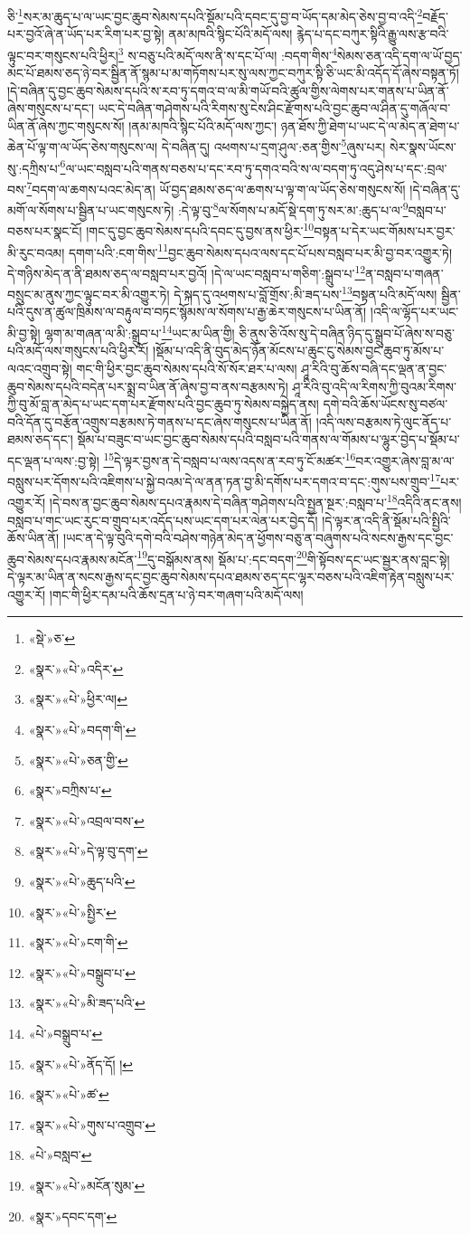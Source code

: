 ཅི་\footnote{«སྡེ་»ཅ་}སར་མ་ཆུད་པ་ལ་ཡང་བྱང་ཆུབ་སེམས་དཔའི་སྡོམ་པའི་དབང་དུ་བྱ་བ་ཡོད་དམ་མེད་ཅེས་བྱ་བ་འདི་\footnote{«སྣར་»«པེ་»འདིར་}བརྗོད་པར་བྱའོ་ཞེ་ན་ཡོད་པར་རིག་པར་བྱ་སྟེ། ནམ་མཁའི་སྙིང་པོའི་མདོ་ལས། རྙེད་པ་དང་བཀུར་སྟིའི་རྒྱུ་ལས་རྩ་བའི་ལྟུང་བར་གསུངས་པའི་ཕྱིར།\footnote{«སྣར་»«པེ་»ཕྱིར་ལ།} ས་བཅུ་པའི་མདོ་ལས་ནི་ས་དང་པོ་ལ། :བདག་གིས་\footnote{«སྣར་»«པེ་»བདག་གི་}སེམས་ཅན་འདི་དག་ལ་ཡོ་བྱད་མང་པོ་ཐམས་ཅད་ཉེ་བར་སྦྱིན་ནོ་སྙམ་པ་མ་གཏོགས་པར་སུ་ལས་ཀྱང་བཀུར་སྟི་ཅི་ཡང་མི་འདོད་དོ་ཞེས་བསྟན་ཏོ། །དེ་བཞིན་དུ་བྱང་ཆུབ་སེམས་དཔའི་ས་རབ་ཏུ་དགའ་བ་ལ་མི་གཡོ་བའི་ཚུལ་གྱིས་ལེགས་པར་གནས་པ་ཡིན་ནོ་ཞེས་གསུངས་པ་དང་། ཡང་དེ་བཞིན་གཤེགས་པའི་རིགས་སུ་ངེས་ཤིང་རྫོགས་པའི་བྱང་ཆུབ་ལ་ཤིན་དུ་གཞོལ་བ་ཡིན་ནོ་ཞེས་ཀྱང་གསུངས་སོ། །ནམ་མཁའི་སྙིང་པོའི་མདོ་ལས་ཀྱང་། ཉན་ཐོས་ཀྱི་ཐེག་པ་ཡང་དེ་ལ་མེད་ན་ཐེག་པ་ཆེན་པོ་ལྟ་ག་ལ་ཡོད་ཅེས་གསུངས་ལ། དེ་བཞིན་དུ། འཕགས་པ་དྲག་ཤུལ་:ཅན་གྱིས་\footnote{«སྣར་»«པེ་»ཅན་གྱི་}ཞུས་པར། སེར་སྣས་ཡོངས་སུ་:དཀྲིས་པ་\footnote{«སྣར་»བཀྲིས་པ་}ལ་ཡང་བསླབ་པའི་གནས་བཅས་པ་དང་རབ་ཏུ་དགའ་བའི་ས་ལ་བདག་ཏུ་འདུ་ཤེས་པ་དང་:བྲལ་བས་\footnote{«སྣར་»«པེ་»འབྲལ་བས་}བདག་ལ་ཆགས་པའང་མེད་ན། ཡོ་བྱད་ཐམས་ཅད་ལ་ཆགས་པ་ལྟ་ག་ལ་ཡོད་ཅེས་གསུངས་སོ། །དེ་བཞིན་དུ་མགོ་ལ་སོགས་པ་སྦྱིན་པ་ཡང་གསུངས་ཏེ། :དེ་ལྟ་བུ་\footnote{«སྣར་»«པེ་»དེ་ལྟ་བུ་དག་}ལ་སོགས་པ་མདོ་སྡེ་དག་ཏུ་སར་མ་:ཆུད་པ་ལ་\footnote{«སྣར་»«པེ་»ཆུད་པའི་}བསླབ་པ་བཅས་པར་སྣང་ངོ། །གང་དུ་བྱང་ཆུབ་སེམས་དཔའི་དབང་དུ་བྱས་ནས་ཕྱིར་\footnote{«སྣར་»«པེ་»སྤྱིར་}བསྟན་པ་དེར་ཡང་གོམས་པར་བྱར་མི་རུང་བའམ། དགག་པའི་:ངག་གིས་\footnote{«སྣར་»«པེ་»ངག་གི་}བྱང་ཆུབ་སེམས་དཔའ་ལས་དང་པོ་པས་བསླབ་པར་མི་བྱ་བར་འགྱུར་ཏེ། དེ་གཉིས་མེད་ན་ནི་ཐམས་ཅད་ལ་བསླབ་པར་བྱའོ། །དེ་ལ་ཡང་བསླབ་པ་གཅིག་:སྒྲུབ་པ་\footnote{«སྣར་»«པེ་»བསྒྲུབ་པ་}ན་བསླབ་པ་གཞན་བསྲུང་མ་ནུས་ཀྱང་ལྟུང་བར་མི་འགྱུར་ཏེ། དེ་སྐད་དུ་འཕགས་པ་བློ་གྲོས་:མི་ཟད་པས་\footnote{«སྣར་»«པེ་»མི་ཟད་པའི་}བསྟན་པའི་མདོ་ལས། སྦྱིན་པའི་དུས་ན་ཚུལ་ཁྲིམས་ལ་བརྟུལ་བ་བཏང་སྙོམས་ལ་སོགས་པ་རྒྱ་ཆེར་གསུངས་པ་ཡིན་ནོ། །འདི་ལ་ལྷོད་པར་ཡང་མི་བྱ་སྟེ། ལྷག་མ་གཞན་ལ་མི་:སྒྲུབ་པ་\footnote{«པེ་»བསྒྲུབ་པ་}ཡང་མ་ཡིན་གྱི། ཅི་ནུས་ཅི་འོས་སུ་དེ་བཞིན་ཉིད་དུ་སྒྲུབ་པོ་ཞེས་ས་བཅུ་པའི་མདོ་ལས་གསུངས་པའི་ཕྱིར་རོ། །སྡོམ་པ་འདི་ནི་བུད་མེད་ཉོན་མོངས་པ་ཆུང་ངུ་སེམས་བྱང་ཆུབ་ཏུ་མོས་པ་ལའང་འགྲུབ་སྟེ། གང་གི་ཕྱིར་བྱང་ཆུབ་སེམས་དཔའི་སོ་སོར་ཐར་པ་ལས། ཤཱ་རིའི་བུ་ཆོས་བཞི་དང་ལྡན་ན་བྱང་ཆུབ་སེམས་དཔའི་བདེན་པར་སྨྲ་བ་ཡིན་ནོ་ཞེས་བྱ་བ་ནས་བརྩམས་ཏེ། ཤཱ་རིའི་བུ་འདི་ལ་རིགས་ཀྱི་བུའམ་རིགས་ཀྱི་བུ་མོ་བླ་ན་མེད་པ་ཡང་དག་པར་རྫོགས་པའི་བྱང་ཆུབ་ཏུ་སེམས་བསྐྱེད་ནས། དགེ་བའི་ཆོས་ཡོངས་སུ་བཙལ་བའི་དོན་དུ་བརྩོན་འགྲུས་བརྩམས་ཏེ་གནས་པ་དང་ཞེས་གསུངས་པ་ཡིན་ནོ། །འདི་ལས་བརྩམས་ཏེ་ལུང་ནོད་པ་ཐམས་ཅད་དང་། སྡོམ་པ་བཟུང་བ་ཡང་བྱང་ཆུབ་སེམས་དཔའི་བསླབ་པའི་གནས་ལ་གོམས་པ་ལྷུར་བྱེད་པ་སྡོམ་པ་དང་ལྡན་པ་ལས་:བྱ་སྟེ། \footnote{«སྣར་»«པེ་»ནོད་དོ། ། }དེ་ལྟར་བྱས་ན་དེ་བསླབ་པ་ལས་འདས་ན་རབ་ཏུ་ངོ་མཚར་\footnote{«སྣར་»«པེ་»ཚ་}བར་འགྱུར་ཞེས་བླ་མ་ལ་བསླུས་པར་དོགས་པའི་འཇིགས་པ་སྐྱེ་བའམ་དེ་ལ་ནན་ཏན་བྱ་མི་དགོས་པར་དགའ་བ་དང་:གུས་པས་གྲུབ་\footnote{«སྣར་»«པེ་»གུས་པ་འགྲུབ་}པར་འགྱུར་རོ། །དེ་བས་ན་བྱང་ཆུབ་སེམས་དཔའ་རྣམས་དེ་བཞིན་གཤེགས་པའི་སྤྱན་སྔར་:བསླབ་པ་\footnote{«པེ་»བསླབ་}འདིའི་ནང་ནས། བསླབ་པ་གང་ཡང་རུང་བ་གྲུབ་པར་འདོད་པས་ཡང་དག་པར་ལེན་པར་བྱེད་དོ། །དེ་ལྟར་ན་འདི་ནི་སྡོམ་པའི་སྤྱིའི་ཆོས་ཡིན་ནོ། །ཡང་ན་དེ་ལྟ་བུའི་དགེ་བའི་བཤེས་གཉེན་མེད་ན་ཕྱོགས་བཅུ་ན་བཞུགས་པའི་སངས་རྒྱས་དང་བྱང་ཆུབ་སེམས་དཔའ་རྣམས་མངོན་\footnote{«སྣར་»«པེ་»མངོན་སུམ་}དུ་བསྒོམས་ནས། སྡོམ་པ་:དང་བདག་\footnote{«སྣར་»དབང་དག་}གི་སྟོབས་དང་ཡང་སྦྱར་ནས་བླང་སྟེ། དེ་ལྟར་མ་ཡིན་ན་སངས་རྒྱས་དང་བྱང་ཆུབ་སེམས་དཔའ་ཐམས་ཅད་དང་ལྷར་བཅས་པའི་འཇིག་རྟེན་བསླུས་པར་འགྱུར་རོ། །གང་གི་ཕྱིར་དམ་པའི་ཆོས་དྲན་པ་ཉེ་བར་གཞག་པའི་མདོ་ལས། 
